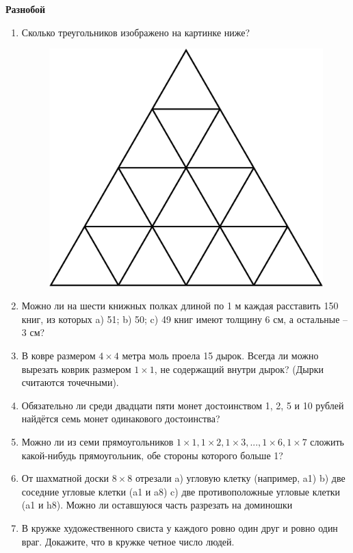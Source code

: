 \documentclass{article}
\begin{document}
\large
	
\begin{center}
	\textbf{Разнобой}
\end{center}


\begin{enumerate}[label*=\protect\fbox{\arabic{enumi}}]
	
\item Сколько треугольников изображено на картинке ниже?

\begin{figure}[h]
	\centering
	\includegraphics[width=0.3\linewidth]{img.png}
\end{figure}

\item Можно ли на шести книжных полках длиной по 1 м каждая расставить 150 книг, из которых a) 51; b) 50; c) 49 книг имеют толщину 6 см, а остальные – 3 см?

\item В ковре размером $4 \times 4$ метра моль проела 15 дырок. Всегда ли можно вырезать коврик размером $1 \times 1$, не содержащий внутри дырок? (Дырки считаются точечными).

\item Обязательно ли среди двадцати пяти монет достоинством 1, 2, 5 и 10 рублей найдётся семь монет одинакового достоинства?

\item Можно ли из семи прямоугольников $1 \times1, 1 \times2, 1 \times3, ..., 1 \times6, 1 \times7$ сложить какой-нибудь прямоугольник, обе стороны которого больше 1?

\item От шахматной доски $8 \times 8$ отрезали a) угловую клетку (например, a1) b) две соседние угловые клетки (a1 и a8) c) две противоположные угловые клетки (a1 и h8). Можно ли оставшуюся часть разрезать на доминошки

\item В кружке художественного свиста у каждого ровно один друг и ровно один враг. Докажите, что в кружке четное число людей.


\end{enumerate}
\end{document}
